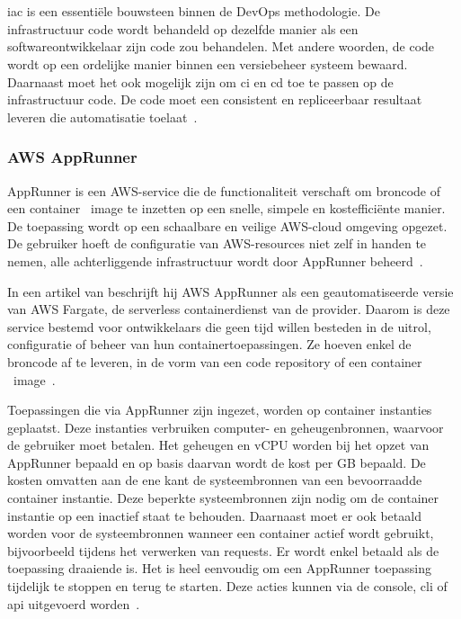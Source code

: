 \chapter{}
\label{ch:stand-van-zaken}

\acrfull{iac} is een essentiële bouwsteen binnen de DevOps methodologie.
De infrastructuur code wordt behandeld op dezelfde manier als een softwareontwikkelaar zijn code zou behandelen.
Met andere woorden, de code wordt op een ordelijke manier binnen een versiebeheer systeem bewaard.
Daarnaast moet het ook mogelijk zijn om \acrfull{ci} en \acrfull{cd} toe te passen op de infrastructuur code.
De code moet een consistent en repliceerbaar resultaat leveren die automatisatie toelaat~\autocite{Mansoor2014}.

\subsection{AWS AppRunner}
\label{sec:service-apprunner}

AppRunner is een AWS-service die de functionaliteit verschaft om broncode of een container ~\gls{image} te inzetten op een snelle, simpele en kostefficiënte manier.
De toepassing wordt op een schaalbare en veilige AWS-cloud omgeving opgezet.
De gebruiker hoeft de configuratie van AWS-resources niet zelf in handen te nemen, alle achterliggende infrastructuur wordt door AppRunner beheerd~\autocite{Khen2022}.

In een artikel van \textcite{Aussems2021} beschrijft hij AWS AppRunner als een geautomatiseerde versie van AWS Fargate, de serverless containerdienst van de provider.
Daarom is deze service bestemd voor ontwikkelaars die geen tijd willen besteden in de uitrol, configuratie of beheer van hun containertoepassingen.
Ze hoeven enkel de broncode af te leveren, in de vorm van een code repository of een container ~\gls{image}~\autocite{Khen2022}.

Toepassingen die via AppRunner zijn ingezet, worden op container instanties geplaatst.
Deze instanties verbruiken computer- en geheugenbronnen, waarvoor de gebruiker moet betalen.
Het geheugen en vCPU worden bij het opzet van AppRunner bepaald en op basis daarvan wordt de kost per GB bepaald.
De kosten omvatten aan de ene kant de systeembronnen van een bevoorraadde container instantie.
Deze beperkte systeembronnen zijn nodig om de container instantie op een inactief staat te behouden.
Daarnaast moet er ook betaald worden voor de systeembronnen wanneer een container actief wordt gebruikt, bijvoorbeeld tijdens het verwerken van requests.
Er wordt enkel betaald als de toepassing draaiende is.
Het is heel eenvoudig om een AppRunner toepassing tijdelijk te stoppen en terug te starten.
Deze acties kunnen via de console, \acrshort{cli} of \acrshort{api} uitgevoerd worden~\autocite{AWSAppRunnerPricing}.

